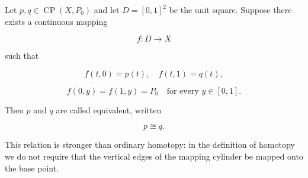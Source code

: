 Let $p, q \in \operatorname{CP}(X, P_0)$ and let $D = [0,1]^2$ be the unit square. Suppose there exists a continuous mapping

$$f: D \to X$$

such that

$$f(t, 0) = p(t), \quad f(t, 1) = q(t),$$

$$f(0, y) = f(1, y) = P_0 \quad \text{for every } y \in [0, 1].$$

Then $p$ and $q$ are called equivalent, written

$$p \cong q.$$

This relation is stronger than ordinary homotopy: in the definition of homotopy we do not require that the vertical edges of the mapping cylinder be mapped onto the base point.
